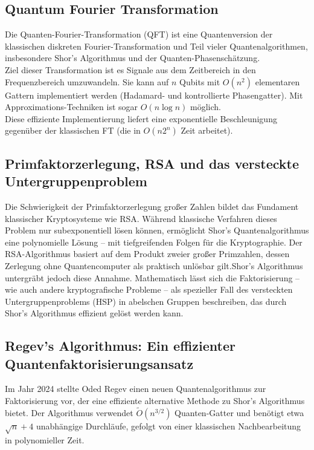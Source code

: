 \subsection{Quantum Fourier Transformation}

Die Quanten-Fourier-Transformation (QFT) ist eine Quantenversion der klassischen diskreten Fourier-Transformation und Teil vieler Quantenalgorithmen, insbesondere Shor’s Algorithmus und der Quanten-Phasenschätzung.\\
Ziel dieser Transformation ist es Signale aus dem Zeitbereich in den Frequenzbereich umzuwandeln.
Sie kann auf $n$ Qubits mit $O(n^2)$ elementaren Gattern implementiert werden (Hadamard- und kontrollierte Phasengatter). Mit Approximations-Techniken ist sogar $O(n\log n)$ möglich.\\
Diese effiziente Implementierung liefert eine exponentielle Beschleunigung gegenüber der klassischen FT (die in $O(n2^n)$ Zeit arbeitet).

\subsection{Primfaktorzerlegung, RSA und das versteckte Untergruppenproblem}

Die Schwierigkeit der Primfaktorzerlegung großer Zahlen bildet das Fundament klassischer Kryptosysteme wie RSA. Während klassische Verfahren dieses Problem nur subexponentiell lösen können, ermöglicht Shor’s Quantenalgorithmus eine polynomielle Lösung – mit tiefgreifenden Folgen für die Kryptographie. Der RSA-Algorithmus basiert auf dem Produkt zweier großer Primzahlen, dessen Zerlegung ohne Quantencomputer als praktisch unlösbar gilt.Shor’s Algorithmus untergräbt jedoch diese Annahme. Mathematisch lässt sich die Faktorisierung – wie auch andere kryptografische Probleme – als spezieller Fall des versteckten Untergruppenproblems (HSP) in abelschen Gruppen beschreiben, das durch Shor’s Algorithmus effizient gelöst werden kann.

\subsection{Regev's Algorithmus: Ein effizienter Quantenfaktorisierungsansatz}

Im Jahr 2024 stellte Oded Regev einen neuen Quantenalgorithmus zur Faktorisierung vor, der eine effiziente alternative Methode zu Shor's Algorithmus bietet. Der Algorithmus verwendet $\tilde{O}(n^{3/2})$ Quanten-Gatter und benötigt etwa $\sqrt{n} + 4$ unabhängige Durchläufe, gefolgt von einer klassischen Nachbearbeitung in polynomieller Zeit. 

